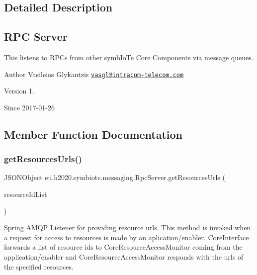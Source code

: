 \subsection{Detailed Description}
\subsection*{R\+PC Server}

This listens to R\+P\+Cs from other symb\+Io\+Te Core Components via message queues.

\begin{DoxyAuthor}{Author}
Vasileios Glykantzis \href{mailto:vasgl@intracom-telecom.com}{\tt vasgl@intracom-\/telecom.\+com} 
\end{DoxyAuthor}
\begin{DoxyVersion}{Version}
1. 
\end{DoxyVersion}
\begin{DoxySince}{Since}
2017-\/01-\/26 
\end{DoxySince}


\subsection{Member Function Documentation}
\mbox{\label{classeu_1_1h2020_1_1symbiote_1_1messaging_1_1RpcServer_a3f4dbd0b54f371c2375215b3c13dff81}} 
\subsubsection{\texorpdfstring{get\+Resources\+Urls()}{getResourcesUrls()}}
{\footnotesize\ttfamily J\+S\+O\+N\+Object eu.\+h2020.\+symbiote.\+messaging.\+Rpc\+Server.\+get\+Resources\+Urls (\begin{DoxyParamCaption}\item[{J\+S\+O\+N\+Object}]{resource\+Id\+List }\end{DoxyParamCaption})}

Spring A\+M\+QP Listener for providing resource urls. This method is invoked when a request for access to resources is made by an aplication/enabler. Core\+Interface forwards a list of resource ids to Core\+Resource\+Access\+Monitor coming from the application/enabler and Core\+Resource\+Access\+Monitor responds with the urls of the specified resources.


